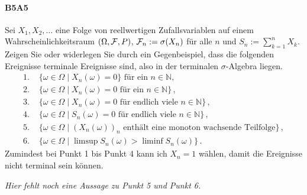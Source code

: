 \documentclass{article}
\begin{document}
\paragraph{B5A5}
Sei $X_1,X_2,\dots$ eine Folge von reellwertigen Zufallsvariablen auf einem Wahrscheinlichkeitsraum $(\Omega,{\cal F},P)$, ${\cal F}_n:=\sigma(X_n)$ für alle $n$ und $S_n:=\sum_{k=1}^nX_k$.
Zeigen Sie oder widerlegen Sie durch ein Gegenbeispiel, dass die folgenden Ereignisse terminale Ereignisse sind, also in der terminalen $\sigma$-Algebra liegen.
\begin{align*}
  \text{1.~}&\{\omega\in\Omega\mid X_n(\omega)=0\}\text{ für ein $n\in\mathbb{N}$,}\\
  \text{2.~}&\{\omega\in\Omega\mid X_n(\omega)=0\text{ für ein $n\in\mathbb{N}$}\}\,,\\
  \text{3.~}&\{\omega\in\Omega\mid X_n(\omega)=0\text{ für endlich viele $n\in\mathbb{N}$}\}\,,\\
  \text{4.~}&\{\omega\in\Omega\mid S_n(\omega)=0\text{ für endlich viele $n\in\mathbb{N}$}\}\,,\\
  \text{5.~}&\{\omega\in\Omega\mid (X_n(\omega))_n\text{ enthält eine monoton wachsende Teilfolge}\}\,,\\
  \text{6.~}&\{\omega\in\Omega\mid \limsup S_n(\omega)>\liminf S_n(\omega)\}\,.
\end{align*}
Zumindest bei Punkt 1 bis Punkt 4 kann ich $X_n=1$ wählen, damit die Ereignisse nicht terminal sein können.

\emph{Hier fehlt noch eine Aussage zu Punkt 5 und Punkt 6.}
\newpage


\end{document}
